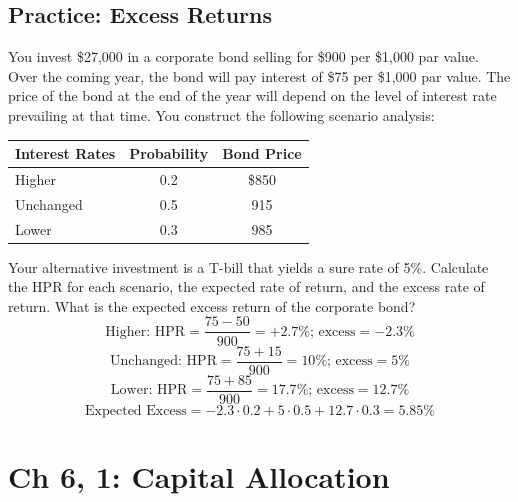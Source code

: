 \documentclass[11pt]{article}
\theoremstyle{definition}
\begin{document}
    \begin{shaded}  
       \subsection{Practice: Excess Returns}

You invest \$27,000 in a corporate bond selling for \$900 per \$1,000 par value.   Over the coming year, the bond will pay interest of \$75 per \$1,000 par value.   The price of the bond at the end of the year will depend on the level of interest rate prevailing at that time.   You construct the following scenario analysis:

        \begin{tabular}{lcc}
            \toprule
             Interest Rates & Probability  & Bond Price \\
             \midrule
             Higher & 0.2 & \$850\\
             Unchanged & 0.5 & 915\\
             Lower & 0.3 & 985\\
             \bottomrule
        \end{tabular}

        Your alternative investment is a T-bill that yields a sure rate of 5\%.   Calculate the HPR for each scenario, the expected rate of return, and the excess rate of return.   What is the expected excess return of the corporate bond?\\
        
        $$\text{Higher: HPR} =  \frac{75-50}{900} = +2.7\% \text{;  excess} = -2.3\%$$
        $$\text{Unchanged: HPR} = \frac{75+15}{900} = 10\% \text{;  excess} =5\%$$
        $$\text{Lower: HPR} = \frac{75+85}{900} = 17.7\% \text{;  excess} =12.7\%$$
        $$\text{Expected Excess} = -2.3\cdot0.2 + 5\cdot0.5 + 12.7\cdot0.3 = 5.85\%$$

    \end{shaded}

\section{ Ch 6, 1: Capital Allocation}
\end{document}
